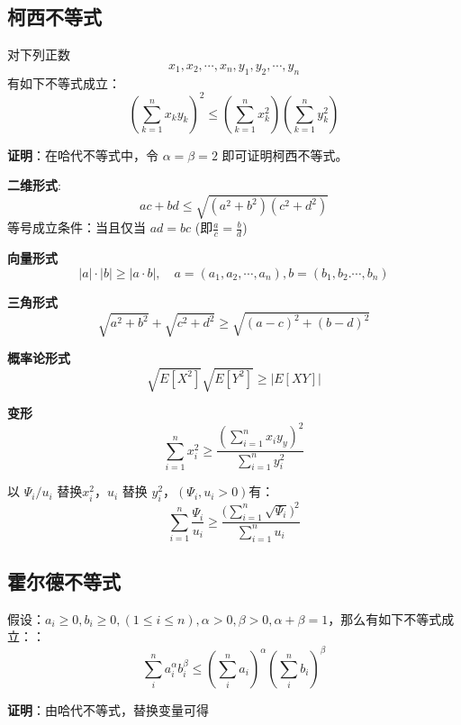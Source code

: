 \documentclass[12pt]{article}
\begin{document}
\subsection{柯西不等式}
\begin{mdframed}[
linecolor=black!40,outerlinewidth=1pt,roundcorner=.5em,innertopmargin=1ex,innerbottommargin=.5\baselineskip,innerrightmargin=1em,innerleftmargin=1em,backgroundcolor=gray!5,
]
对下列正数
$$
x_1, x_2, \cdots, x_n, y_1, y_2, \cdots, y_n
$$
有如下不等式成立：
$$
(\sum_{k=1}^nx_ky_k)^2 \le (\sum_{k=1}^nx_k^2) (\sum_{k=1}^ny_k^2)
$$
\end{mdframed}
\textbf{证明}：在哈代不等式中，令 $\alpha = \beta = 2$ 即可证明柯西不等式。

\begin{mdframed}[
linecolor=black!40,outerlinewidth=1pt,roundcorner=.5em,innertopmargin=1ex,innerbottommargin=.5\baselineskip,innerrightmargin=1em,innerleftmargin=1em,backgroundcolor=gray!5,
]
\textbf{二维形式}:
$$
ac + bd \le \sqrt{(a^2+b^2)(c^2+d^2)}
$$
等号成立条件：当且仅当 $ad = bc$ (即$\frac{a}{c} = \frac{b}{d}$)

\textbf{向量形式}
$$
|a| \cdot |b| \ge |a\cdot b|, \quad a = (a_1, a_2, \cdots, a_n), b = (b_1, b_2. \cdots, b_n)
$$

\textbf{三角形式}
$$
\sqrt{a^2+b^2}+\sqrt{c^2+d^2} \ge \sqrt{(a-c)^2 + (b-d)^2}
$$

\textbf{概率论形式}
$$
\sqrt{E[X^2]}\sqrt{E[Y^2]} \ge |E[XY]|
$$

\textbf{变形}
$$
\sum_{i=1}^nx_i^2 \ge \frac{(\sum_{i=1}^nx_iy_y)^2}{\sum_{i=1}^ny_i^2}
$$

以 $\Psi_i/u_i$ 替换$x_i^2$，$u_i$ 替换 $y_i^2$，$(\Psi_i, u_i > 0)$有：
$$
\sum_{i=1}^n\frac{\Psi_i}{u_i} \ge \frac{\Big(\sum_{i=1}^n\sqrt{\Psi_i}\Big)^2}{\sum_{i=1}^nu_i}
$$
\end{mdframed}

\subsection{霍尔德不等式}
\begin{mdframed}[
linecolor=black!40,outerlinewidth=1pt,roundcorner=.5em,innertopmargin=1ex,innerbottommargin=.5\baselineskip,innerrightmargin=1em,innerleftmargin=1em,backgroundcolor=gray!5,
]
假设：$a_i \ge 0, b_i \ge 0, (1 \le i \le n), \alpha > 0, \beta > 0, \alpha + \beta = 1$，那么有如下不等式成立：：
$$
\sum_i^na_i^{\alpha}b_i^{\beta} \le (\sum_i^na_i)^{\alpha}(\sum_i^nb_i)^{\beta}
$$
\end{mdframed}
\textbf{证明}：由哈代不等式，替换变量可得
\end{document}
